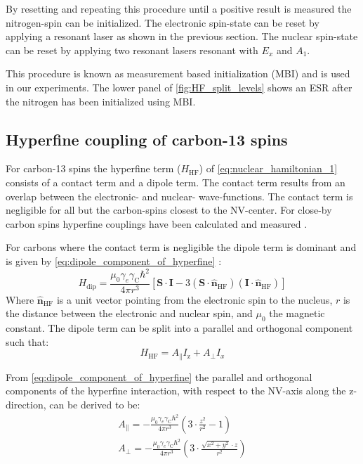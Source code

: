 By resetting and repeating this procedure until a positive result is measured the nitrogen-spin can be initialized.
The electronic spin-state can be reset by applying a resonant laser as shown in the previous section.
The nuclear spin-state can be reset by applying two resonant lasers resonant with $E_x$ and $A_1$.

This procedure is known as measurement based initialization (MBI) and is used in our experiments.
The lower panel of \cref{fig:HF_split_levels} shows an ESR after the nitrogen has been initialized using MBI.

\subsection{Hyperfine coupling of carbon-13 spins}
For carbon-13 spins the hyperfine term ($H_{\mathrm{HF}}$) of \cref{eq:nuclear_hamiltonian_1} consists of a contact term and a dipole term.
The contact term results from an overlap between the electronic- and nuclear- wave-functions.
The contact term is negligible for all but the carbon-spins closest to the NV-center.
For close-by carbon spins hyperfine couplings have been  calculated \citep{Gali2008Ab,Gali2009Identification} and measured \citep{Smeltzer201113}.

For carbons where the contact term is negligible the dipole term is dominant and is given by \cref{eq:dipole_component_of_hyperfine} \citep{Lange2012Quantum}:
\begin{equation}
\label{eq:dipole_component_of_hyperfine}
H_{\mathrm{dip}} = \frac{\mu_0 \gamma_e \gamma_{\mathrm{C}} \hbar^2 }{4 \pi r^3} [ \bm{S \cdot I} - 3 (\bm S \cdot \hat{\bm{n}}_{\mathrm{HF}})(\bm I \cdot \hat{\bm{n}}_{\mathrm{HF}})]
\end{equation}
Where $\hat{\bm{n}}_{\mathrm{HF}}$ is a unit vector pointing from the electronic spin to the nucleus, $r$ is the distance between the electronic and nuclear spin, and $\mu_0$ the magnetic constant.
The dipole term can be split into a parallel and orthogonal component such that:
\begin{equation}
     H_{\mathrm{HF}} = A_\parallel I_\mathrm{z} + A_\perp I_x
 \end{equation}


From \cref{eq:dipole_component_of_hyperfine}  the parallel and orthogonal components of the hyperfine interaction, with respect to the NV-axis along the z-direction, can be derived to be:
 \begin{align}
A_\parallel= - \frac{\mu_0 \gamma_e \gamma_{\mathrm{C}} \hbar^2 }{4 \pi r^3} \left(3\cdot \frac{z^2}{r^2}-1\right)\\
 A_\perp =  -\frac{\mu_0 \gamma_e \gamma_{\mathrm{C}} \hbar^2 }{4 \pi r^3}\left( 3\cdot\frac{\sqrt{x^2+y^2}\cdot z}{r^2}\right)
\end{align}



